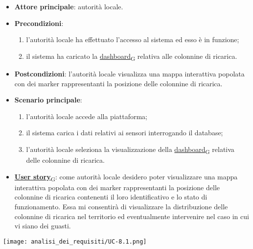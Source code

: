 \begin{itemize}
	\item \textbf{Attore principale}: autorità locale.
	\item \textbf{Precondizioni}:
	      \begin{enumerate}
		      \item l'autorità locale ha effettuato l'accesso al sistema ed esso è in funzione;
		      \item il sistema ha caricato la \href{https://7last.github.io/docs/rtb/documentazione-interna/glossario\#dashboard}{dashboard\textsubscript{G}} relativa alle colonnine di ricarica.
	      \end{enumerate}
	\item \textbf{Postcondizioni}: l'autorità locale visualizza una mappa interattiva popolata con dei marker rappresentanti la posizione delle colonnine di ricarica.
	\item \textbf{Scenario principale}:
	      \begin{enumerate}
		      \item l'autorità locale accede alla piattaforma;
		      \item il sistema carica i dati relativi ai sensori interrogando il database;
		      \item l'autorità locale seleziona la visualizzazione della \href{https://7last.github.io/docs/rtb/documentazione-interna/glossario\#dashboard}{dashboard\textsubscript{G}} relativa delle colonnine di ricarica.
	      \end{enumerate}
	\item \href{https://7last.github.io/docs/rtb/documentazione-interna/glossario\#user-story}{\textbf{User story}\textsubscript{G}}:
	      come autorità locale desidero poter visualizzare una mappa interattiva popolata con dei marker rappresentanti la posizione delle colonnine di ricarica
	      contenenti il loro identificativo e lo stato di funzionamento. Essa mi consentirà di visualizzare la distribuzione delle colonnine di ricarica nel territorio
	      ed eventualmente intervenire nel caso in cui vi siano dei guasti.
\end{itemize}
\begin{center}
	\texttt{[image: analisi\_dei\_requisiti/UC-8.1.png]}
\end{center}

